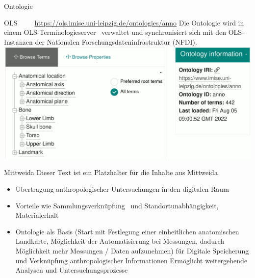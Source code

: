 \documentclass[portrait,final,a0paper,fontscale=0.320]{imiseposter}
\begin{document}
\begin{poster}
\begin{posterbox}[name=ontology,below=background]{Ontologie}
\begin{subsectionbox}{OLS~~~~~\small\url{https://ols.imise.uni-leipzig.de/ontologies/anno}}
Die Ontologie wird in einem OLS-Terminologieserver~\cite{ols} verwaltet und synchronisiert sich mit den OLS-Instanzen der Nationalen Forschungsdateninfrastruktur (NFDI).
\includegraphics[width=\textwidth]{img/ols.png}
\end{subsectionbox}

\end{posterbox}
\begin{posterbox}[name=results,column=1]{Mittweida}
Dieser Text ist ein Platzhalter für die Inhalte aus Mittweida
\begin{itemize}
\item Übertragung anthropologischer Untersuchungen in den digitalen Raum~\cite{digitalisierung}
\item Vorteile wie Sammlungsverknüpfung~\cite{spurensuche} und Standortunabhängigkeit, Materialerhalt 
\item Ontologie als Basis (Start mit Festlegung einer einheitlichen anatomischen Landkarte, Möglichkeit der Automatisierung bei Messungen, dadurch Möglichkeit mehr Messungen / Daten aufzunehmen) für Digitale Speicherung und Verknüpfung anthropologischer Informationen 
Ermöglicht weitergehende Analysen und Untersuchungsprozesse 
\end{itemize}


\end{posterbox}
\end{poster}
\end{document}
